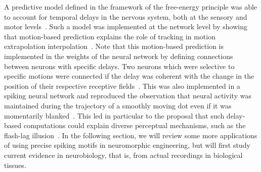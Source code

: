 \documentclass[brainsci, %
               review,submit,pdftex,moreauthors
               ]{Definitions/mdpi}
\begin{document}
A predictive model defined in the framework of the free-energy principle was able to account for temporal delays in the nervous system, both at the sensory and motor levels~\citep{perrinet_active_2014}.  %
Such a model was implemented at the network level by showing that motion-based prediction explains the role of tracking in motion extrapolation interpolation~\citep{khoei_motion-based_2013}. Note that this motion-based prediction is implemented in the weights of the neural network by defining connections between neurons with specific delays.  Two neurons which were selective to specific motions were connected if the delay was coherent with the change in the position of their respective receptive fields~\citep{hogendoorn_predictive_2019}. This was also implemented in a spiking neural network and reproduced the observation that neural activity was maintained during the trajectory of a smoothly moving dot even if it was momentarily blanked~\citep{kaplan_anisotropic_2013}. This led in particular to the proposal that such delay-based computations could explain diverse perceptual mechanisms, such as the flash-lag illusion~\citep{khoei_flash-lag_2017}. 
In the following section, we will review some more applications of using precise spiking motifs in neuromorphic engineering, but will first study current evidence in neurobiology, that is, from actual recordings in biological tissues.
\end{document}
